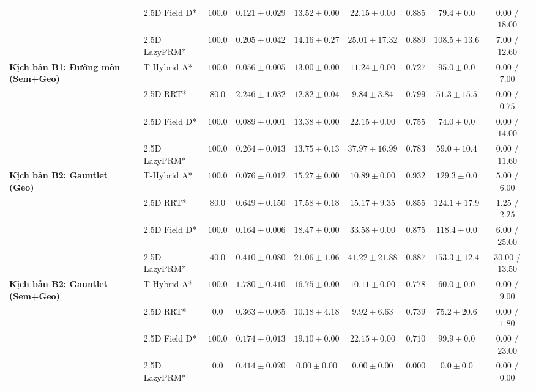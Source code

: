 \documentclass[a4paper,fleqn]{cas-sc}
\begin{document}
\begin{table}[width=\linewidth,pos=htbp]
{\begin{tabular}{llccccccc}
& 2.5D Field D* & $100.0$ & $0.121 \pm 0.029$ & $13.52 \pm 0.00$ & $22.15 \pm 0.00$ & $0.885$ & $79.4 \pm 0.0$ & $0.00$ / $18.00$ \\
& 2.5D LazyPRM* & $100.0$ & $0.205 \pm 0.042$ & $14.16 \pm 0.27$ & $25.01 \pm 17.32$ & $0.889$ & $108.5 \pm 13.6$ & $7.00$ / $12.60$ \\
\midrule
\multirow{4}{*}{\textbf{Kịch bản B1: Đường mòn (Sem+Geo)}}
& T-Hybrid A*   & $100.0$ & $\mathbf{0.056 \pm 0.005}$ & $13.00 \pm 0.00$ & $11.24 \pm 0.00$ & $0.727$ & $95.0 \pm 0.0$ & $\mathbf{0.00}$ / $7.00$ \\
& 2.5D RRT*     & $80.0$  & $2.246 \pm 1.032$ & $\mathbf{12.82 \pm 0.04}$ & $\mathbf{9.84 \pm 3.84}$ & $\mathbf{0.799}$ & $\mathbf{51.3 \pm 15.5}$ & $\mathbf{0.00}$ / $0.75$ \\
& 2.5D Field D* & $100.0$ & $0.089 \pm 0.001$ & $13.38 \pm 0.00$ & $22.15 \pm 0.00$ & $0.755$ & $74.0 \pm 0.0$ & $\mathbf{0.00}$ / $14.00$ \\
& 2.5D LazyPRM* & $100.0$ & $0.264 \pm 0.013$ & $13.75 \pm 0.13$ & $37.97 \pm 16.99$ & $0.783$ & $59.0 \pm 10.4$ & $\mathbf{0.00}$ / $11.60$ \\
\midrule
\midrule
\multirow{4}{*}{\textbf{Kịch bản B2: Gauntlet (Geo)}}
& T-Hybrid A*   & $100.0$ & $0.076 \pm 0.012$ & $15.27 \pm 0.00$ & $10.89 \pm 0.00$ & $0.932$ & $129.3 \pm 0.0$ & $5.00$ / $6.00$ \\
& 2.5D RRT*     & $80.0$  & $0.649 \pm 0.150$ & $17.58 \pm 0.18$ & $15.17 \pm 9.35$ & $0.855$ & $124.1 \pm 17.9$ & $1.25$ / $2.25$ \\
& 2.5D Field D* & $100.0$ & $0.164 \pm 0.006$ & $18.47 \pm 0.00$ & $33.58 \pm 0.00$ & $0.875$ & $118.4 \pm 0.0$ & $6.00$ / $25.00$ \\
& 2.5D LazyPRM* & $40.0$  & $0.410 \pm 0.080$ & $21.06 \pm 1.06$ & $41.22 \pm 21.88$ & $0.887$ & $153.3 \pm 12.4$ & $30.00$ / $13.50$ \\
\midrule
\multirow{4}{*}{\textbf{Kịch bản B2: Gauntlet (Sem+Geo)}}
& T-Hybrid A*   & $\mathbf{100.0}$ & $1.780 \pm 0.410$ & $\mathbf{16.75 \pm 0.00}$ & $\mathbf{10.11 \pm 0.00}$ & $\mathbf{0.778}$ & $\mathbf{60.0 \pm 0.0}$ & $\mathbf{0.00}$ / $9.00$ \\
& 2.5D RRT*     & $0.0$   & $0.363 \pm 0.065$ & $10.18 \pm 4.18$ & $9.92 \pm 6.63$ & $0.739$ & $75.2 \pm 20.6$ & $0.00$ / $1.80$ \\
& 2.5D Field D* & $\mathbf{100.0}$ & $\mathbf{0.174 \pm 0.013}$ & $19.10 \pm 0.00$ & $22.15 \pm 0.00$ & $0.710$ & $99.9 \pm 0.0$ & $\mathbf{0.00}$ / $23.00$ \\
& 2.5D LazyPRM* & $0.0$   & $0.414 \pm 0.020$ & $0.00 \pm 0.00$ & $0.00 \pm 0.00$ & $0.000$ & $0.0 \pm 0.0$ & $0.00$ / $0.00$ \\
\bottomrule
\end{tabular}%
}
\end{table}
\end{document}
